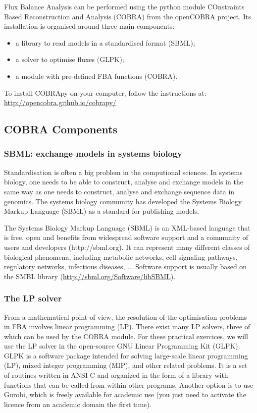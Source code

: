 \documentclass[a4paper,11pt]{exam}
\begin{document}
Flux Balance Analysis can be performed using the python module COnstraints Based Reconstruction and Analysis (COBRA) from the openCOBRA project.
Its installation is organised around three main components:
\begin{itemize}
\item a library to read models in a standardised format (SBML);
\item a solver to optimise fluxes (GLPK);
\item a module with pre-defined FBA functions (COBRA).
\end{itemize}

To install COBRApy on your computer, follow the instructions at: \url{http://opencobra.github.io/cobrapy/}

\subsection*{COBRA Components}

\subsubsection*{SBML: exchange models in systems biology}

Standardisation is often a big problem in the computional sciences.
In systems biology, one needs to be able to construct, analyse and exchange models in the same way as one needs to construct, analyse and exchange sequence data in genomics.
The systems biology community has developed the Systems Biology Markup Language (SBML) as a standard for publishing models.

The Systems Biology Markup Language (SBML) is an XML-based language that is free, open and benefits from widespread software support and a community of users and developers (http://sbml.org).
It can represent many different classes of biological phenomena, including metabolic networks, cell signaling pathways, regulatory networks, infectious diseases, ...
Software support is usually based on the SMBL library (\url{http://sbml.org/Software/libSBML}).

\subsubsection*{The LP solver}

From a mathematical point of view, the resolution of the optimisation problems in FBA involves linear programming (LP).
There exist many LP solvers, three of which can be used by the COBRA module.
For these practical exercices, we will use the LP solver in the open-source GNU Linear Programming Kit (GLPK).
GLPK is a software package intended for solving large-scale linear programming (LP), mixed integer programming (MIP), and other related problems.
It is a set of routines written in ANSI C and organized in the form of a library with functions that can be called from within other programs.
Another option is to use Gurobi, which is freely available for academic use (you just need to activate the licence from an academic domain the first time).
\end{document}
